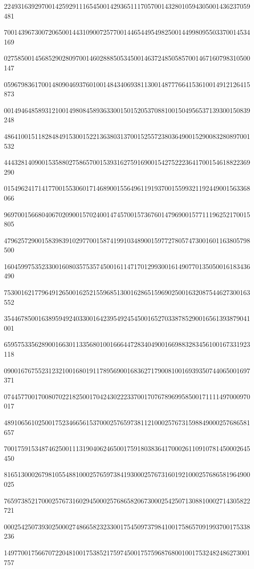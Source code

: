 \documentclass[10pt]{article}
\begin{document}
224931639297001425929111654500142936511170570014328010594305001436237059481\par
700143967300720650014431090072577001446544954982500144998095503370014534169\par
027585001456852902809700146028885053450014637248505857001467160798310500147\par
059679836170014809046937601001484340693811300148777664153610014912126415873\par
001494648589312100149808458936330015015205370881001504956537139300150839248\par
486410015118284849153001522136380313700152557238036490015290083280897001532\par
444328140900153588027586570015393162759169001542752223641700154618822369290\par
015496241714177001553060171468900155649611919370015599321192449001563368066\par
969700156680406702090015702400147457001573676014796900157711196252170015805\par
479625729001583983910297700158741991034890015977278057473001601163805798500\par
160459975352330016080357535745001611471701299300161490770135050016183436490\par
753001621779649126500162521559685130016286515969025001632087544627300163552\par
354467850016389594924033001642395492454500165270338785290016561393879041001\par
659575335628900166301133568010016664472834049001669883283456100167331923118\par
090016767552312321001680191178956900168362717900810016939350744065001697371\par
074457700170080702218250017042430222337001707678969958500171111497000970017\par
489106561025001752346656153700025765973811210002576731598849000257686581657\par
700175915348746250011131904062465001759180383641700026110910781450002645450\par
816513000267981055488100025765973841930002576731601921000257686581964900025\par
765973852170002576731602945000257686582067300025425071308810002714305822721\par
000254250739302500027486658232330017545097379841001758657091993700175338236\par
149770017566707220481001753852175974500175759687680010017532482486273001757\par
\end{document}
